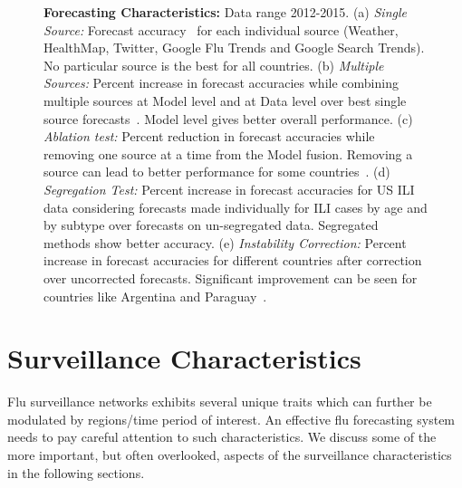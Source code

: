 \documentclass[10pt,letterpaper]{article}
\begin{document}
\begin{figure}[H]
  \centering

  \caption{\textbf{Forecasting Characteristics:} Data range 2012-2015.
  (a) \textit{Single Source:}
  Forecast accuracy~\cite{tabataba2015smq} for each individual source (Weather, HealthMap, 
  Twitter, Google Flu Trends and Google Search Trends). No particular 
  source is the best for all countries.
  (b) \textit{Multiple Sources:}
  Percent increase in forecast accuracies while combining multiple sources at 
  Model level and at Data level over best single source forecasts~\cite{chakraborty2014forecasting}.
  Model level gives better overall performance.
  (c) \textit{Ablation test:}
  Percent reduction in forecast accuracies while 
  removing one source at a time from the Model fusion. 
  Removing a source can lead to better performance for some
  countries~\cite{chakraborty2014forecasting}.
  (d) \textit{Segregation Test:}
  Percent increase in forecast accuracies for US ILI data considering forecasts made individually 
  for ILI cases by age and by subtype  over forecasts on un-segregated data.
  Segregated methods show better accuracy.
  (e) \textit{Instability Correction:}
  Percent increase in forecast accuracies for different countries after
  correction over uncorrected forecasts.  Significant improvement can be seen
  for countries like Argentina and Paraguay~\cite{chakraborty2014forecasting}.
  \label{fig2}
  }
\end{figure}

\section*{Surveillance Characteristics}
Flu surveillance networks exhibits several unique traits which can further be
modulated by regions/time period of interest. An effective flu forecasting 
system needs to pay careful attention to such characteristics. We discuss some
of the more important, but often overlooked, aspects of the surveillance
characteristics in the following sections.
\end{document}
